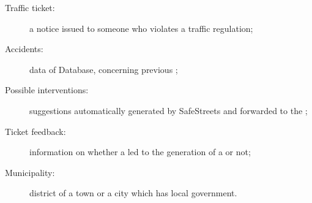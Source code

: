 \documentclass[../../RASD.tex]{subfiles}
\begin{document}
\begin{description}
	\item[Traffic ticket:] a notice issued to someone who violates a traffic regulation;
	\item[Accidents:] data of  Database, concerning previous ;
	\item[Possible interventions:] suggestions automatically generated by SafeStreets and forwarded to the ;
	\item[Ticket feedback:] information on whether a  led to the generation of a  or not;
	\item[Municipality:] district of a town or a city which has local government.
\end{description}
\end{document}
